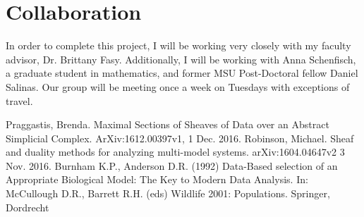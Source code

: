 \documentclass[12pt]{article}
\begin{document}
\section{Collaboration}
In order to complete this project, I will be working very closely with my faculty advisor, Dr. Brittany Fasy. Additionally, I will be working with Anna Schenfisch, a graduate student in mathematics, and former MSU Post-Doctoral fellow Daniel Salinas. Our group will be meeting once a week on Tuesdays with exceptions of travel. 


 \newpage
 
 \begin{thebibliography}{widestlabel}
Praggastis, Brenda. Maximal Sections of Sheaves of Data over an Abstract Simplicial Complex. ArXiv:1612.00397v1, 1 Dec. 2016.
Robinson, Michael. Sheaf and duality methods for analyzing
multi-model systems. arXiv:1604.04647v2 3 Nov. 2016.
Burnham K.P., Anderson D.R. (1992) Data-Based selection of an Appropriate Biological Model: The Key to Modern Data Analysis. In: McCullough D.R., Barrett R.H. (eds) Wildlife 2001: Populations. Springer, Dordrecht
 \end{thebibliography}


\end{document}
